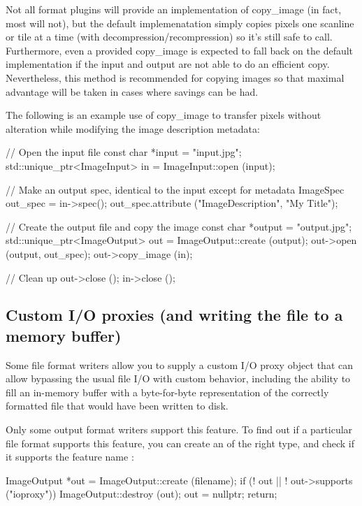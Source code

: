 Not all format plugins will provide an implementation of {\cf
  copy_image} (in fact, most will not), but the default implemenatation
simply copies pixels one scanline or tile at a time (with
decompression/recompression) so it's still safe to call.  Furthermore,
even a provided {\cf copy_image} is expected to fall back on the default
implementation if the input and output are not able to do an efficient
copy.  Nevertheless, this method is recommended
for copying images so that maximal advantage will be taken in cases
where savings can be had.

The following is an example use of {\cf copy_image} to transfer pixels
without alteration while modifying the image description metadata:

\begin{code}
    // Open the input file
    const char *input = "input.jpg";
    std::unique_ptr<ImageInput> in = ImageInput::open (input);

    // Make an output spec, identical to the input except for metadata
    ImageSpec out_spec = in->spec();
    out_spec.attribute ("ImageDescription", "My Title");

    // Create the output file and copy the image
    const char *output = "output.jpg";
    std::unique_ptr<ImageOutput> out = ImageOutput::create (output);
    out->open (output, out_spec);
    out->copy_image (in);

    // Clean up
    out->close ();
    in->close ();
\end{code}


\subsection{Custom I/O proxies (and writing the file to a memory buffer)}
\label{sec:imageoutput:ioproxy}

Some file format writers allow you to supply a custom I/O proxy object that
can allow bypassing the usual file I/O with custom behavior, including the
ability to fill an in-memory buffer with a byte-for-byte representation of
the correctly formatted file that would have been written to disk.

Only some output format writers support this feature. To find out if a
particular file format supports this feature, you can create an \ImageOutput
of the right type, and check if it supports the feature name :

\begin{code}
    ImageOutput *out = ImageOutput::create (filename);
    if (! out  ||  ! out->supports ("ioproxy")) {
        ImageOutput::destroy (out);
        out = nullptr;
        return;
    }
\end{code}

